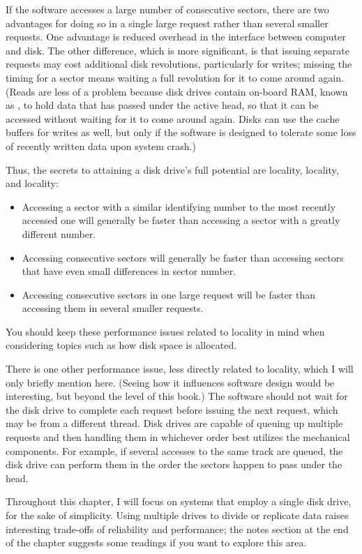 If the software accesses a large number of consecutive
sectors, there are two advantages for doing so in a single
large request rather than several smaller requests.  One advantage is reduced overhead in the interface
between computer and disk.  The other difference, which is more significant, is
that issuing separate requests may cost additional disk revolutions,
particularly for writes; missing the timing for a sector means waiting
a full revolution for it to come around again. (Reads are less of a
problem because disk drives contain on-board RAM, known as , to hold data that has
passed under the active head, so that it can be accessed without
waiting for it to come around again.  Disks can use the cache buffers for writes
as well, but only if the software is designed to tolerate some loss of
recently written data upon system crash.)

Thus, the secrets to attaining a disk drive's full potential are
locality, locality, and locality:
\begin{itemize}
\item
Accessing a sector with a similar identifying number to the most recently accessed one
will generally be faster than accessing a sector with a greatly
different number.
\item
Accessing consecutive sectors will generally be faster than accessing
sectors that have even small differences in sector number.
\item
Accessing consecutive sectors in one large request will be faster
than accessing them in several smaller requests.
\end{itemize}
You should keep these performance issues related to locality in mind when
considering topics such as how disk space is allocated.

There is one other performance issue, less directly related to
locality, which I will only briefly mention here. (Seeing how it
influences software design would be interesting, but beyond the level
of this book.)  The software should not wait for the disk drive to
complete each request before issuing the next request, which may be
from a different thread.  Disk drives are
capable of queuing up multiple requests and then handling them in whichever
order best utilizes the mechanical components.  For example, if
several accesses to the same track are queued, the disk drive can
perform them in the order the sectors happen to pass under the head.

Throughout this chapter, I will focus on systems
that employ a single disk drive, for the sake of simplicity.  Using
multiple drives to divide or replicate data raises interesting
trade-offs of reliability and performance; the notes section at the
end of the chapter suggests some readings if you want to explore this
area.

